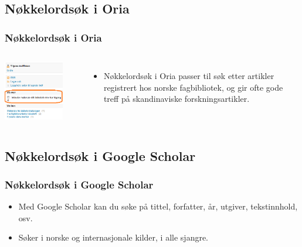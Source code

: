 \subsection{Nøkkelordsøk i Oria}
\begin{frame}
  \frametitle{Nøkkelordsøk i Oria}
  \begin{columns}
    \centering
    \includegraphics[width=0.8\textwidth]{../media/inkluder-materiale.png}

    \begin{itemize}
    \item Nøkkelordsøk i Oria passer til søk etter artikler registrert hos norske fagbibliotek, og gir ofte gode treff på skandinaviske forskningsartikler.
    \end{itemize}
  \end{columns}
\end{frame}

\subsection{Nøkkelordsøk i Google Scholar}
\begin{frame}
  \frametitle{Nøkkelordsøk i Google Scholar}
  \begin{itemize}
  \item Med Google Scholar kan du søke på tittel, forfatter, år, utgiver, tekstinnhold, osv.
  \item Søker i norske og internasjonale kilder, i alle sjangre.
  \end{itemize}
\end{frame}

